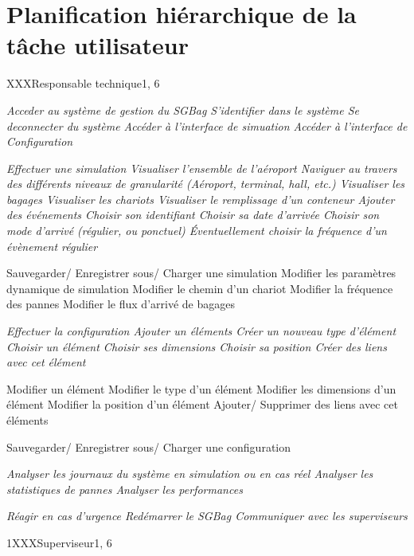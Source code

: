 \newpage
\part{Planification hiérarchique de la tâche utilisateur}

\phtu
{XXX}{Responsable technique}{1, 6}
{
\begin{tabular}
	\it{} Acceder au système de gestion du SGBag
		\sit{} S'identifier dans le système
		\sit{} Se deconnecter du système
		\sit{} Accéder à l'interface de simuation
		\sit{} Accéder à l'interface de Configuration

	\it{} Effectuer une simulation
		\sit{} Visualiser l'ensemble de l'aéroport
			\ssit{} Naviguer au travers des différents niveaux de granularité (Aéroport, terminal, hall, \textsl{etc.})
			\ssit{} Visualiser les bagages
			\ssit{} Visualiser les chariots
			\ssit{} Visualiser le remplissage d'un conteneur
		\sit{} Ajouter des événements
			\ssit{} Choisir son identifiant
			\ssit{} Choisir sa date d'arrivée
			\ssit{} Choisir son mode d'arrivé (régulier, ou ponctuel)
			\ssit{} Éventuellement choisir la fréquence d'un évènement régulier

		\sit{} Sauvegarder/ Enregistrer sous/ Charger une simulation
		\sit{} Modifier les paramètres dynamique de simulation
			\ssit{} Modifier le chemin d'un chariot	
			\ssit{} Modifier la fréquence des pannes
			\ssit{} Modifier le flux d'arrivé de bagages
	
	\it{} Effectuer la configuration
		\sit{} Ajouter un éléments 
			\ssit{} Créer un nouveau type d'élément
			\ssit{} Choisir un élément
			\ssit{} Choisir ses dimensions
			\ssit{} Choisir sa position
			\ssit{} Créer des liens avec cet élément

		\sit{} Modifier un élément
			\ssit{} Modifier le type d'un élément
			\ssit{} Modifier les dimensions d'un élément
			\ssit{} Modifier la position d'un élément
			\ssit{} Ajouter/ Supprimer des liens avec cet éléments
		
		\sit{} Sauvegarder/ Enregistrer sous/ Charger une configuration

	\it{} Analyser les journaux du système en simulation ou en cas réel
		\sit{} Analyser les statistiques de pannes
		\sit{} Analyser les performances

	\it{} Réagir en cas d'urgence 
		\sit{} Redémarrer le SGBag
		\sit{} Communiquer avec les superviseurs

\end{tabular}
}

\phtu
{1}{XXX}{Superviseur}{1, 6}
{
	\it{}
}
